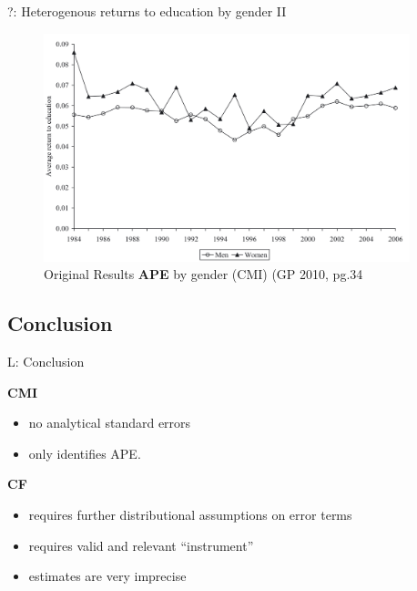 \documentclass[10pt,ignorenonframetext,]{beamer}
\providecommand{\tightlist}{%
  \setlength{\itemsep}{0pt}\setlength{\parskip}{0pt}}
\begin{document}
\begin{frame}{?: Heterogenous returns to education by gender II}
\protect\hypertarget{heterogenous-returns-to-education-by-gender-ii}{}

\begin{figure}
\centering
\includegraphics[width=\textwidth,height=2.60417in]{img/GP2010_CMI_gender.png}
\caption{Original Results \textbf{APE} by gender (CMI) (GP 2010, pg.34}
\end{figure}

\end{frame}

\hypertarget{conclusion}{%
\subsection{Conclusion}\label{conclusion}}

\begin{frame}{L: Conclusion}
\protect\hypertarget{l-conclusion}{}

\textbf{CMI}

\begin{itemize}
\tightlist
\item
  no analytical standard errors
\item
  only identifies APE.
\end{itemize}

\textbf{CF}

\begin{itemize}
\tightlist
\item
  requires further distributional assumptions on error terms
\item
  requires valid and relevant ``instrument''
\item
  estimates are very imprecise
\end{itemize}

\end{frame}
\end{document}
